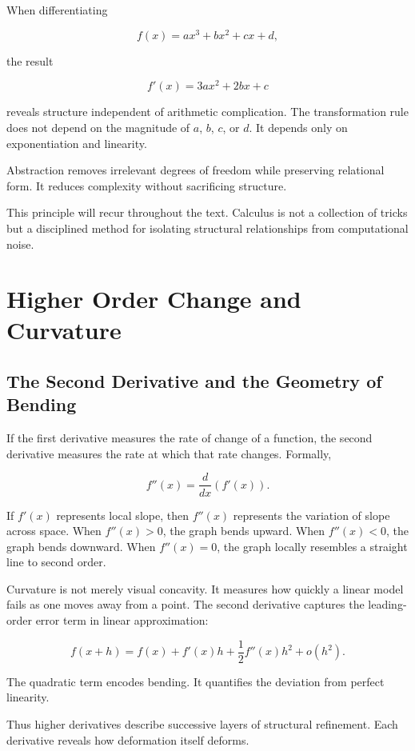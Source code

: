 \documentclass[12pt]{book}
\begin{document}
When differentiating

\[
f(x) = ax^3 + bx^2 + cx + d,
\]

the result

\[
f'(x) = 3ax^2 + 2bx + c
\]

reveals structure independent of arithmetic complication. The transformation rule does not depend on the magnitude of $a$, $b$, $c$, or $d$. It depends only on exponentiation and linearity.

Abstraction removes irrelevant degrees of freedom while preserving relational form. It reduces complexity without sacrificing structure.

This principle will recur throughout the text. Calculus is not a collection of tricks but a disciplined method for isolating structural relationships from computational noise.

\chapter{Higher Order Change and Curvature}

\section{The Second Derivative and the Geometry of Bending}

If the first derivative measures the rate of change of a function, the second derivative measures the rate at which that rate changes. Formally,

\[
f''(x) = \frac{d}{dx}\left(f'(x)\right).
\]

If $f'(x)$ represents local slope, then $f''(x)$ represents the variation of slope across space. When $f''(x) > 0$, the graph bends upward. When $f''(x) < 0$, the graph bends downward. When $f''(x) = 0$, the graph locally resembles a straight line to second order.

Curvature is not merely visual concavity. It measures how quickly a linear model fails as one moves away from a point. The second derivative captures the leading-order error term in linear approximation:

\[
f(x+h) = f(x) + f'(x)h + \frac{1}{2}f''(x)h^2 + o(h^2).
\]

The quadratic term encodes bending. It quantifies the deviation from perfect linearity.

Thus higher derivatives describe successive layers of structural refinement. Each derivative reveals how deformation itself deforms.
\end{document}
